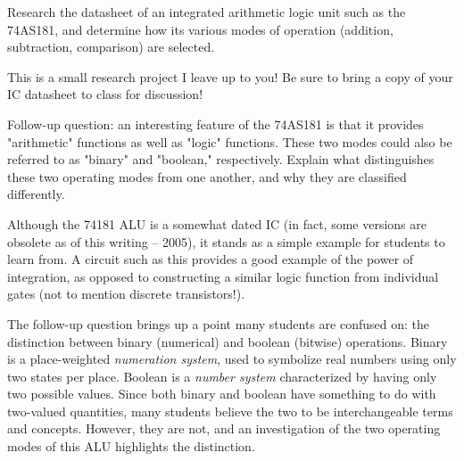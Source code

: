 

Research the datasheet of an integrated arithmetic logic unit such as the 74AS181, and determine how its various modes of operation (addition, subtraction, comparison) are selected.







This is a small research project I leave up to you!  Be sure to bring a copy of your IC datasheet to class for discussion!

\vskip 10pt

Follow-up question: an interesting feature of the 74AS181 is that it provides "arithmetic" functions as well as "logic" functions.  These two modes could also be referred to as "binary" and "boolean," respectively.  Explain what distinguishes these two operating modes from one another, and why they are classified differently.







Although the 74181 ALU is a somewhat dated IC (in fact, some versions are obsolete as of this writing -- 2005), it stands as a simple example for students to learn from.  A circuit such as this provides a good example of the power of integration, as opposed to constructing a similar logic function from individual gates (not to mention discrete transistors!).

The follow-up question brings up a point many students are confused on: the distinction between binary (numerical) and boolean (bitwise) operations.  Binary is a place-weighted {\it numeration system}, used to symbolize real numbers using only two states per place.  Boolean is a {\it number system} characterized by having only two possible values.  Since both binary and boolean have something to do with two-valued quantities, many students believe the two to be interchangeable terms and concepts.  However, they are not, and an investigation of the two operating modes of this ALU highlights the distinction.




